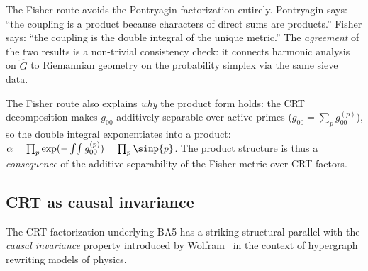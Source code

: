 \documentclass[12pt,a4paper]{article}
\begin{document}
\begin{remark}\mBR
\label{rem:fisher_independence}
The Fisher route avoids the Pontryagin factorization entirely.
Pontryagin says: ``the coupling is a product because characters of
direct sums are products.'' Fisher says: ``the coupling is the
double integral of the unique metric.'' The \emph{agreement} of the
two results is a non-trivial consistency check: it connects harmonic
analysis on $\widehat{G}$ to Riemannian geometry on the probability
simplex via the same sieve data.

The Fisher route also explains \emph{why} the product form holds:
the CRT decomposition makes $g_{00}$ additively separable over active
primes ($g_{00} = \sum_p g_{00}^{(p)}$), so the double integral
exponentiates into a product: $\alpha = \prod_p \exp(-\int\!\int g_{00}^{(p)}) = \prod_p \sinp{p}$.
The product structure is thus a \emph{consequence} of the additive
separability of the Fisher metric over CRT factors.
\end{remark}

\subsection{CRT as causal invariance}
\label{sec:ch9_causal}

The CRT factorization underlying BA5 has a striking structural
parallel with the \emph{causal invariance} property introduced by
Wolfram~\cite{Wolfram2020} in the context of hypergraph rewriting
models of physics.
\end{document}
